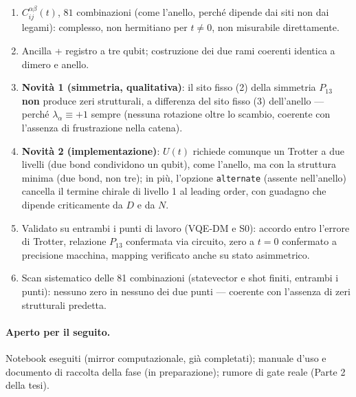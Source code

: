 \documentclass[11pt,a4paper]{article}
\begin{document}
\begin{enumerate}[leftmargin=*]
\item $C_{ij}^{\alpha\beta}(t)$, $81$ combinazioni (come l'anello, perché dipende dai siti non
dai legami): complesso, non hermitiano per $t\neq0$, non misurabile direttamente.
\item Ancilla + registro a tre qubit; costruzione dei due rami coerenti identica a dimero e
anello.
\item \textbf{Novità 1 (simmetria, qualitativa)}: il sito fisso (2) della simmetria $P_{13}$
\textbf{non} produce zeri strutturali, a differenza del sito fisso (3) dell'anello --- perché
$\lambda_\alpha\equiv+1$ sempre (nessuna rotazione oltre lo scambio, coerente con l'assenza di
frustrazione nella catena).
\item \textbf{Novità 2 (implementazione)}: $U(t)$ richiede comunque un Trotter a due livelli (due
bond condividono un qubit), come l'anello, ma con la struttura minima (due bond, non tre); in più,
l'opzione \texttt{alternate} (assente nell'anello) cancella il termine chirale di livello 1 al
leading order, con guadagno che dipende criticamente da $D$ e da $N$.
\item Validato su entrambi i punti di lavoro (VQE-DM e S0): accordo entro l'errore di Trotter,
relazione $P_{13}$ confermata via circuito, zero a $t=0$ confermato a precisione macchina, mapping
verificato anche su stato asimmetrico.
\item Scan sistematico delle 81 combinazioni (statevector e shot finiti, entrambi i punti):
nessuno zero in nessuno dei due punti --- coerente con l'assenza di zeri strutturali predetta.
\end{enumerate}

\paragraph{Aperto per il seguito.} Notebook eseguiti (mirror computazionale, già completati);
manuale d'uso e documento di raccolta della fase (in preparazione); rumore di gate reale (Parte 2
della tesi).
\end{document}
